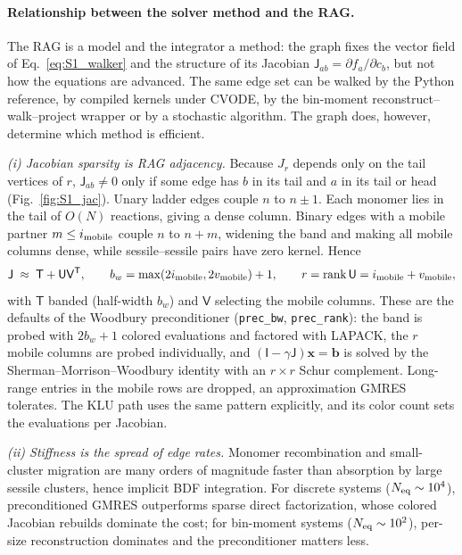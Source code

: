 \paragraph{Relationship between the solver method and the RAG.}
The RAG is a model and the integrator a method: the graph fixes the vector
field of Eq.~\eqref{eq:S1_walker} and the structure of its Jacobian
$\mathsf{J}_{ab}=\partial f_a/\partial c_b$, but not how the equations are
advanced. The same edge set can be walked by the Python reference, by
compiled kernels under CVODE, by the bin-moment
reconstruct--walk--project wrapper or by a stochastic algorithm. The
graph does, however, determine which method is efficient.

\emph{(i) Jacobian sparsity is RAG adjacency.} Because $J_r$ depends only
on the tail vertices of $r$, $\mathsf{J}_{ab}\neq0$ only if some edge has
$b$ in its tail and $a$ in its tail or head (Fig.~\ref{fig:S1_jac}).
Unary ladder edges couple $n$ to $n\pm1$. Each monomer lies in the tail of
$O(N)$ reactions, giving a dense column. Binary edges with a mobile
partner $m\le i_{\rm mobile}$ couple $n$ to $n+m$, widening the band and
making all mobile columns dense, while sessile--sessile pairs have zero
kernel. Hence
\begin{equation}
  \mathsf{J} \;\approx\; \mathsf{T} + \mathsf{U}\mathsf{V}^{\mathsf T},\qquad
  b_w=\max(2i_{\rm mobile},2v_{\rm mobile})+1,\qquad
  r=\operatorname{rank}\mathsf{U}=i_{\rm mobile}+v_{\rm mobile},
  \label{eq:S1_woodbury}
\end{equation}
with $\mathsf T$ banded (half-width $b_w$) and $\mathsf{V}$ selecting the
mobile columns. These are the defaults of the Woodbury preconditioner
(\texttt{prec\_bw}, \texttt{prec\_rank}): the band is probed with $2b_w+1$
colored evaluations and factored with LAPACK, the $r$ mobile columns are
probed individually, and $(\mathsf I-\gamma\mathsf J)\mathbf x=\mathbf b$
is solved by the Sherman--Morrison--Woodbury identity \cite{Hager1989}
with an $r\times r$ Schur complement. Long-range entries in the mobile
rows are dropped, an approximation GMRES tolerates. The KLU path uses the
same pattern explicitly, and its color count sets the evaluations per
Jacobian.

\emph{(ii) Stiffness is the spread of edge rates.} Monomer recombination
and small-cluster migration are many orders of magnitude faster than
absorption by large sessile clusters, hence implicit BDF integration. For
discrete systems ($N_{\rm eq}\sim10^4$), preconditioned GMRES outperforms
sparse direct factorization, whose colored Jacobian rebuilds dominate the
cost; for bin-moment systems ($N_{\rm eq}\sim10^2$), per-size
reconstruction dominates and the preconditioner matters less.

